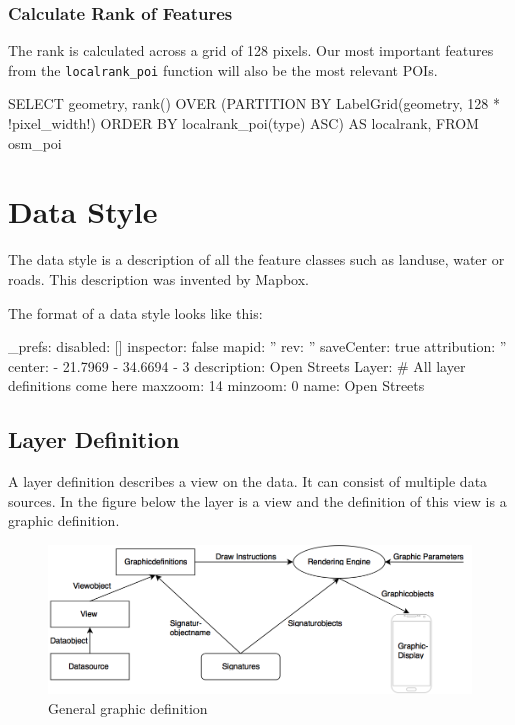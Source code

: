 \subsubsection{Calculate Rank of Features}

The rank is calculated across a grid of 128 pixels. Our most
important features from the \texttt{localrank\_poi} function will
also be the most relevant POIs.

\begin{sqlcode}
SELECT
  geometry,
  rank() OVER (PARTITION BY LabelGrid(geometry, 128 * !pixel_width!)
               ORDER BY localrank_poi(type) ASC) AS localrank,
FROM osm_poi
\end{sqlcode}

\section{Data Style}\label{data_style}

The data style is a description of all the feature classes such as landuse, water or roads. This description was invented by Mapbox.

The format of a data style looks like this:
\begin{yamlcode}
_prefs: 
  disabled: []
  inspector: false
  mapid: ''
  rev: ''
  saveCenter: true
attribution: ''
center: 
  - 21.7969
  - 34.6694
  - 3
description: Open Streets
Layer: 
    # All layer definitions come here
maxzoom: 14
minzoom: 0
name: Open Streets
\end{yamlcode}

\subsection{Layer Definition}\label{layer_definition}
A layer definition describes a view on the data. It can consist of multiple data sources. In the figure below the layer is a view and the definition of this view is a graphic definition.

\begin{figure}[h]
  \centering
  \includegraphics[width=1\textwidth]{images/graphic_definition.png}
  \caption{General graphic definition}
\end{figure}

